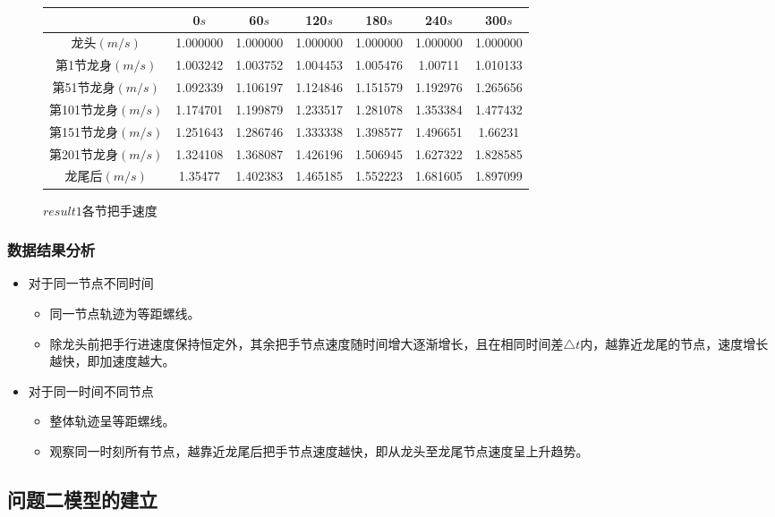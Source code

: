 \documentclass[withoutpreface,bwprint]{cumcmthesis}
\begin{document}
\begin{figure}
	\centering
	\begin{tabular}{|c|c|c|c|c|c|c|}
		\hline
		& 0$s$ & 60$s$ & 120$s$ & 180$s$ & 240$s$ & 300$s$ \\ \hline
		龙头$(m/s)$ & 1.000000 & 1.000000 & 1.000000 & 1.000000 & 1.000000 & 1.000000 \\ \hline
		第1节龙身$(m/s)$ & 1.003242 & 1.003752& 1.004453 & 1.005476 & 1.00711 & 1.010133 \\ \hline
		第51节龙身$(m/s)$ & 1.092339 & 1.106197 & 1.124846 & 1.151579 & 1.192976 & 1.265656 \\ \hline
		第101节龙身$(m/s)$ & 1.174701 & 1.199879 & 1.233517 & 1.281078 & 1.353384 &1.477432 \\ \hline
		第151节龙身$(m/s)$ & 1.251643 & 1.286746 & 1.333338 & 1.398577 & 1.496651 & 1.66231 \\ \hline
		第201节龙身$(m/s)$ & 1.324108 & 1.368087 & 1.426196 & 1.506945 & 1.627322 & 1.828585 \\ \hline
		龙尾后$(m/s)$ & 1.35477 & 1.402383 & 1.465185 & 1.552223 & 1.681605 & 1.897099 \\ \hline
	\end{tabular}
	\caption{$result1$各节把手速度}   
	\label{result12}         
\end{figure}
\subsubsection{数据结果分析}
\begin{itemize}
	\item 对于同一节点不同时间
	\begin{itemize} 
		\item 同一节点轨迹为等距螺线。
		\item 除龙头前把手行进速度保持恒定外，其余把手节点速度随时间增大逐渐增长，且在相同时间差$\triangle t $内，越靠近龙尾的节点，速度增长越快，即加速度越大。
	\end{itemize}
	\item 对于同一时间不同节点
	\begin{itemize} 
		\item 整体轨迹呈等距螺线。
		\item 观察同一时刻所有节点，越靠近龙尾后把手节点速度越快，即从龙头至龙尾节点速度呈上升趋势。
	\end{itemize}
\end{itemize}

\subsection{问题二模型的建立}
\end{document}
